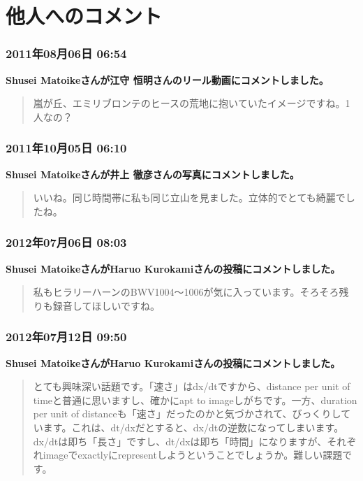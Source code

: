 \chapter{他人へのコメント}

\subsection*{2011年08月06日 06:54}

\textbf{Shusei Matoikeさんが江守 恒明さんのリール動画にコメントしました。}

\begin{quote}
嵐が丘、エミリブロンテのヒースの荒地に抱いていたイメージですね。1人なの？
\end{quote}

\subsection*{2011年10月05日 06:10}

\textbf{Shusei Matoikeさんが井上 徹彦さんの写真にコメントしました。}

\begin{quote}
いいね。同じ時間帯に私も同じ立山を見ました。立体的でとても綺麗でしたね。
\end{quote}

\subsection*{2012年07月06日 08:03}

\textbf{Shusei MatoikeさんがHaruo Kurokamiさんの投稿にコメントしました。}

\begin{quote}
私もヒラリーハーンのBWV1004〜1006が気に入っています。そろそろ残りも録音してほしいですね。
\end{quote}

\subsection*{2012年07月12日 09:50}

\textbf{Shusei MatoikeさんがHaruo Kurokamiさんの投稿にコメントしました。}

\begin{quote}
とても興味深い話題です。「速さ」はdx/dtですから、distance per unit of timeと普通に思いますし、確かにapt to imageしがちです。一方、duration per unit of distanceも「速さ」だったのかと気づかされて、びっくりしています。これは、dt/dxだとすると、dx/dtの逆数になってしまいます。dx/dtは即ち「長さ」ですし、dt/dxは即ち「時間」になりますが、それぞれimageでexactlyにrepresentしようということでしょうか。難しい課題です。
\end{quote}

